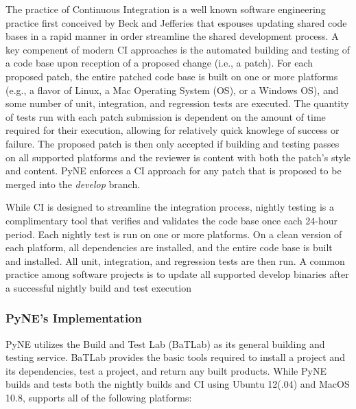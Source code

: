 \documentclass{anstrans}
\begin{document}
The practice of Continuous Integration is a well known software engineering
practice first conceived by Beck and Jefferies \cite{beck1998extreme} that
espouses updating shared code bases in a rapid manner in order streamline the
shared development process. A key compenent of modern CI approaches is the
automated building and testing of a code base upon reception of a proposed
change (i.e., a patch). For each proposed patch, the entire patched code base is
built on one or more platforms (e.g., a flavor of Linux, a Mac Operating System
(OS), or a Windows OS), and some number of unit, integration, and regression
tests are executed. The quantity of tests run with each patch submission is
dependent on the amount of time required for their execution, allowing for
relatively quick knowlege of success or failure. The proposed patch is then only
accepted if building and testing passes on all supported platforms and the
reviewer is content with both the patch's style and content. PyNE enforces a CI
approach for any patch that is proposed to be merged into the \textit{develop}
branch.

While CI is designed to streamline the integration process, nightly testing is a
complimentary tool that verifies and validates the code base once each 24-hour
period. Each nightly test is run on one or more platforms. On a clean version of
each platform, all dependencies are installed, and the entire code base is built
and installed. All unit, integration, and regression tests are then run. A
common practice among software projects is to update all supported develop
binaries after a successful nightly build and test execution

\subsubsection{PyNE's Implementation}

PyNE utilizes the Build and Test Lab (BaTLab) \cite{batlab_2014} as its general
building and testing service. BaTLab provides the basic tools required to
install a project and its dependencies, test a project, and return any built
products. While PyNE builds and tests both the nightly builds and CI using
Ubuntu 12(.04) and MacOS 10.8, supports all of the following platforms:
\end{document}
